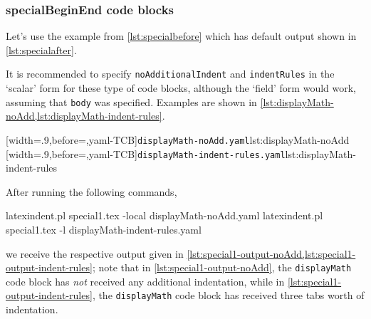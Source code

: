\documentclass[10pt]{article}
\begin{document}
\subsubsection{specialBeginEnd code blocks}
 Let's use the example from \vref{lst:specialbefore} which has default output shown in
 \vref{lst:specialafter}.

 \begin{example}
 It is recommended to specify \texttt{noAdditionalIndent} and \texttt{indentRules} in the
 `scalar' form for these type of code blocks, although the `field' form would work,
 assuming that \texttt{body} was specified. Examples are shown in
 \cref{lst:displayMath-noAdd,lst:displayMath-indent-rules}.
  

 \begin{cmhtcbraster}
  [width=.9\linewidth,before=\centering,yaml-TCB]{\texttt{displayMath-noAdd.yaml}}{lst:displayMath-noAdd}
  [width=.9\linewidth,before=\centering,yaml-TCB]{\texttt{displayMath-indent-rules.yaml}}{lst:displayMath-indent-rules}
 \end{cmhtcbraster}

 After running the following commands, 

 \begin{commandshell}
latexindent.pl special1.tex -local displayMath-noAdd.yaml  
latexindent.pl special1.tex -l displayMath-indent-rules.yaml  
\end{commandshell}

 we receive the respective output given in
 \cref{lst:special1-output-noAdd,lst:special1-output-indent-rules}; note that in
 \cref{lst:special1-output-noAdd}, the \texttt{displayMath} code block has \emph{not}
 received any additional indentation, while in \cref{lst:special1-output-indent-rules},
 the \texttt{displayMath} code block has received three tabs worth of indentation.

 \begin{cmhtcbraster}
 \end{cmhtcbraster}
 \end{example}
\end{document}
